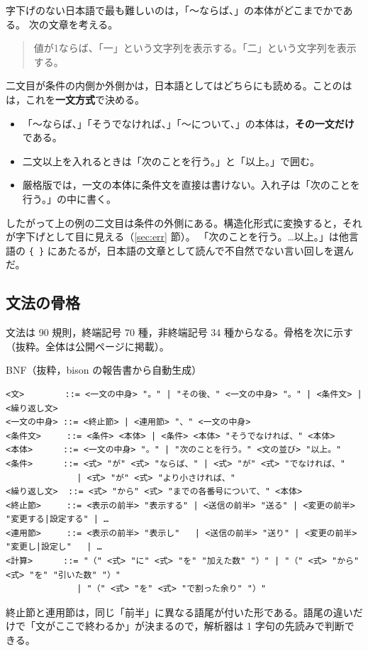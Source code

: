 \documentclass[a4paper,10pt]{ltjsarticle}
\begin{document}
字下げのない日本語で最も難しいのは，「〜ならば、」の本体がどこまでかである。
次の文章を考える。
\begin{quote}
値が1ならば、「一」という文字列を表示する。「二」という文字列を表示する。
\end{quote}
二文目が条件の内側か外側かは，日本語としてはどちらにも読める。ことのはは，これを\textbf{一文方式}で決める。
\begin{itemize}
\item 「〜ならば、」「そうでなければ、」「〜について、」の本体は，\textbf{その一文だけ}である。
\item 二文以上を入れるときは「次のことを行う。」と「以上。」で囲む。
\item 厳格版では，一文の本体に条件文を直接は書けない。入れ子は「次のことを行う。」の中に書く。
\end{itemize}
したがって上の例の二文目は条件の外側にある。構造化形式に変換すると，それが字下げとして目に見える（\ref{sec:err} 節）。
「次のことを行う。…以上。」は他言語の \verb|{ }| にあたるが，日本語の文章として読んで不自然でない言い回しを選んだ。

\subsection{文法の骨格}

文法は 90 規則，終端記号 70 種，非終端記号 34 種からなる。骨格を次に示す（抜粋。全体は公開ページに掲載）。
\begin{prog}{BNF（抜粋，bison の報告書から自動生成）}
\begin{Verbatim}[fontsize=\footnotesize]
<文>        ::= <一文の中身> "。" | "その後、" <一文の中身> "。" | <条件文> | <繰り返し文>
<一文の中身> ::= <終止節> | <連用節> "、" <一文の中身>
<条件文>     ::= <条件> <本体> | <条件> <本体> "そうでなければ、" <本体>
<本体>      ::= <一文の中身> "。" | "次のことを行う。" <文の並び> "以上。"
<条件>      ::= <式> "が" <式> "ならば、" | <式> "が" <式> "でなければ、"
              | <式> "が" <式> "より小さければ、"
<繰り返し文>  ::= <式> "から" <式> "までの各番号について、" <本体>
<終止節>     ::= <表示の前半> "表示する" | <送信の前半> "送る" | <変更の前半> "変更する|設定する" | …
<連用節>     ::= <表示の前半> "表示し"   | <送信の前半> "送り" | <変更の前半> "変更し|設定し"   | …
<計算>      ::= "（" <式> "に" <式> "を" "加えた数" "）" | "（" <式> "から" <式> "を" "引いた数" "）"
              | "（" <式> "を" <式> "で割った余り" "）"
\end{Verbatim}
\end{prog}
終止節と連用節は，同じ「前半」に異なる語尾が付いた形である。語尾の違いだけで「文がここで終わるか」が決まるので，解析器は 1 字句の先読みで判断できる。
\end{document}
